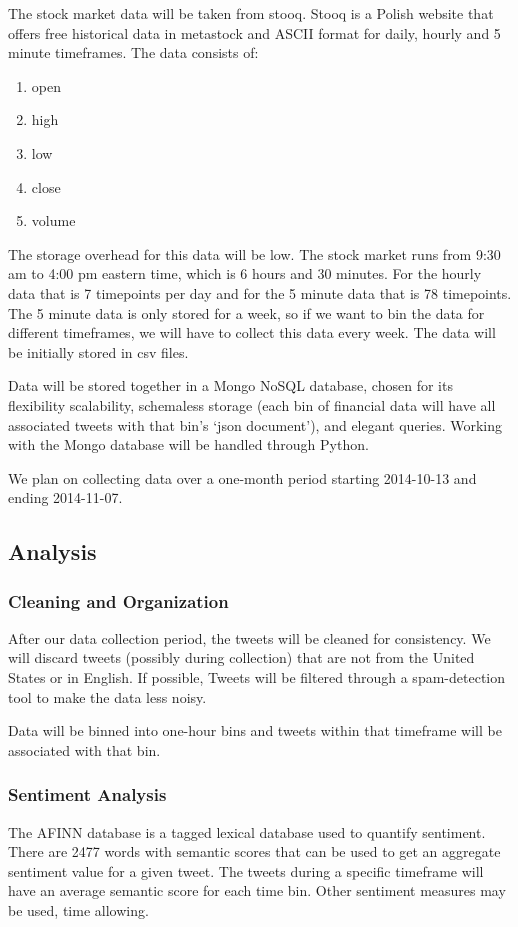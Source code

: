 \documentclass[titlepage]{article}\usepackage[]{graphicx}\usepackage[]{color}
\begin{document}
The stock market data will be taken from stooq. Stooq is a Polish website that offers free historical data in metastock and ASCII format for daily, hourly and 5 minute timeframes. The data consists of:
\begin{enumerate}
\item open
\item high
\item low
\item close
\item volume
\end{enumerate}
The storage overhead for this data will be low. The stock market runs from 9:30 am to 4:00 pm eastern time, which is 6 hours and 30 minutes. For the hourly data that is 7 timepoints per day and for the 5 minute data that is 78 timepoints. The 5 minute data is only stored for a week, so if we want to bin the data for different timeframes, we will have to collect this data every week.  The data will be initially stored in csv files.


Data will be stored together in a Mongo NoSQL database, chosen for its flexibility scalability, schemaless storage (each bin of financial data will have all associated tweets with that bin’s ‘json document’), and elegant queries. Working with the Mongo database will be handled through Python. 

We plan on collecting data over a one-month period starting 2014-10-13 and ending 2014-11-07. 

\subsection{Analysis}

\subsubsection{Cleaning and Organization}
After our data collection period, the tweets will be cleaned for consistency. We will discard tweets (possibly during collection) that are not from the United States or in English. If possible, Tweets will be filtered through a spam-detection tool to make the data less noisy. 

Data will be binned into one-hour bins and tweets within that timeframe will be associated with that bin. 

\subsubsection{Sentiment Analysis}
The AFINN database is a tagged lexical database used to quantify sentiment. There are 2477 words with semantic scores that can be used to get an aggregate sentiment value for a given tweet. The tweets during a specific timeframe will have an average semantic score for each time bin. Other sentiment measures may be used, time allowing. 
\end{document}
